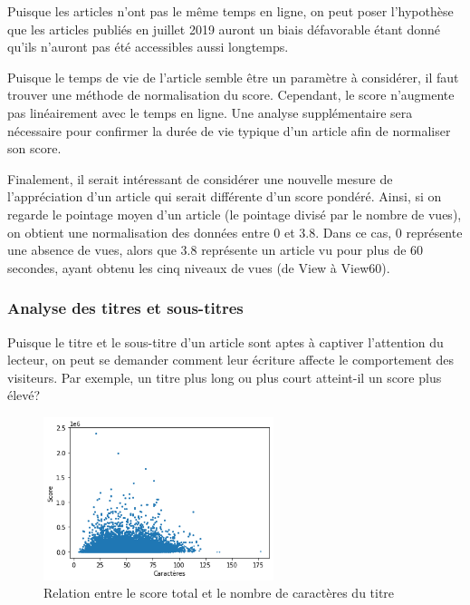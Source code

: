 \documentclass[french]{article}
\begin{document}
Puisque les articles n'ont pas le même temps en ligne, on peut poser l'hypothèse que les articles publiés en juillet 2019 auront un biais défavorable étant donné qu'ils n'auront pas été accessibles aussi longtemps.

Puisque le temps de vie de l'article semble être un paramètre à considérer, il faut trouver une méthode de normalisation du score. Cependant, le score n'augmente pas linéairement avec le temps en ligne. Une analyse supplémentaire sera nécessaire pour confirmer la durée de vie typique d'un article afin de normaliser son score.

Finalement, il serait intéressant de considérer une nouvelle mesure de l'appréciation d'un article qui serait différente d'un score pondéré. Ainsi, si on regarde le pointage moyen d'un article (le pointage divisé par le nombre de vues), on obtient une normalisation des données entre 0 et 3.8.  Dans ce cas, 0 représente une absence de vues, alors que 3.8 représente un article vu pour plus de 60 secondes, ayant obtenu les cinq niveaux de vues (de View à View60).


\subsubsection{Analyse des titres et sous-titres}

Puisque le titre et le sous-titre d'un article sont aptes à captiver l'attention du lecteur, on peut se demander comment leur écriture affecte le comportement des visiteurs. Par exemple, un titre plus long ou plus court atteint-il un score plus élevé?

\begin{figure}[H]
    \centering
    \includegraphics[width=0.6\textwidth]{dot_title_length_score_relation.png}
    \caption{Relation entre le score total et le nombre de caractères du titre}
    \label{fig:dot_title_length_score_relation}
    \end{figure}
\end{document}
